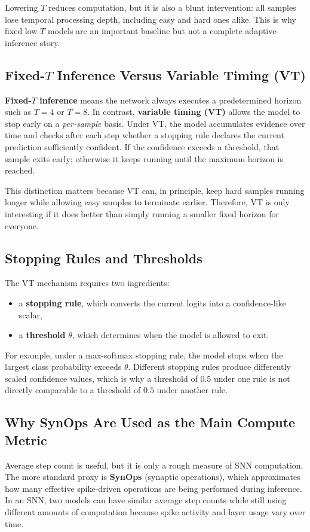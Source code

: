 \documentclass[11pt]{article}
\begin{document}
Lowering $T$ reduces computation, but it is also a blunt intervention: all samples lose temporal processing depth, including easy and hard ones alike. This is why fixed low-$T$ models are an important baseline but not a complete adaptive-inference story.

\subsection{Fixed-$T$ Inference Versus Variable Timing (VT)}
\textbf{Fixed-$T$ inference} means the network always executes a predetermined horizon such as $T=4$ or $T=8$. In contrast, \textbf{variable timing (VT)} allows the model to stop early on a \emph{per-sample} basis. Under VT, the model accumulates evidence over time and checks after each step whether a stopping rule declares the current prediction sufficiently confident. If the confidence exceeds a threshold, that sample exits early; otherwise it keeps running until the maximum horizon is reached.

This distinction matters because VT can, in principle, keep hard samples running longer while allowing easy samples to terminate earlier. Therefore, VT is only interesting if it does better than simply running a smaller fixed horizon for everyone.

\subsection{Stopping Rules and Thresholds}
The VT mechanism requires two ingredients:
\begin{itemize}[leftmargin=1.5em]
    \item a \textbf{stopping rule}, which converts the current logits into a confidence-like scalar,
    \item a \textbf{threshold} $\theta$, which determines when the model is allowed to exit.
\end{itemize}

For example, under a max-softmax stopping rule, the model stops when the largest class probability exceeds $\theta$. Different stopping rules produce differently scaled confidence values, which is why a threshold of $0.5$ under one rule is not directly comparable to a threshold of $0.5$ under another rule.

\subsection{Why SynOps Are Used as the Main Compute Metric}
Average step count is useful, but it is only a rough measure of SNN computation. The more standard proxy is \textbf{SynOps} (synaptic operations), which approximates how many effective spike-driven operations are being performed during inference. In an SNN, two models can have similar average step counts while still using different amounts of computation because spike activity and layer usage vary over time.
\end{document}
